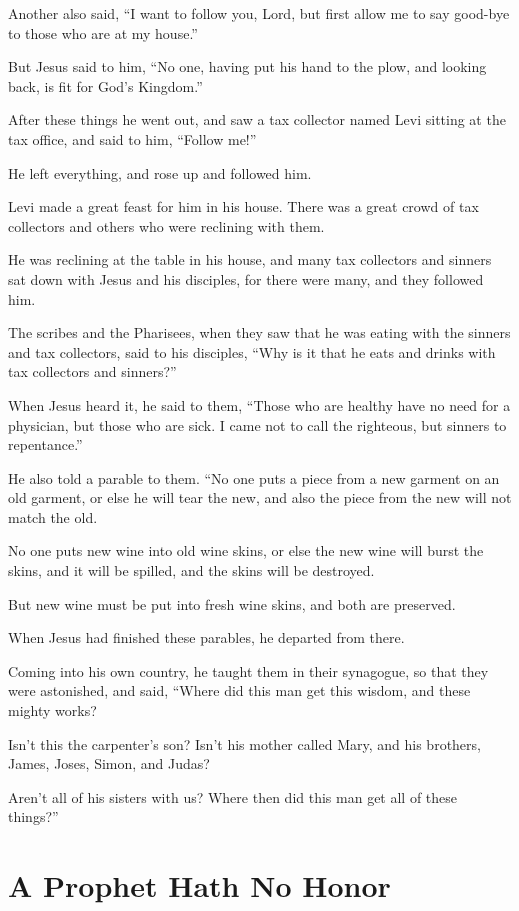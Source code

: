 Another also said, “I want to follow you, Lord, but first allow me to say good-bye to those who are at my house.”

But Jesus said to him, “No one, having put his hand to the plow, and looking back, is fit for God’s Kingdom.”

After these things he went out, and saw a tax collector named Levi sitting at the tax office, and said to him, “Follow me!”

He left everything, and rose up and followed him.

Levi made a great feast for him in his house. There was a great crowd of tax collectors and others who were reclining with them.

He was reclining at the table in his house, and many tax collectors and sinners sat down with Jesus and his disciples, for there were many, and they followed him.

The scribes and the Pharisees, when they saw that he was eating with the sinners and tax collectors, said to his disciples, “Why is it that he eats and drinks with tax collectors and sinners?”

When Jesus heard it, he said to them, “Those who are healthy have no need for a physician, but those who are sick. I came not to call the righteous, but sinners to repentance.”

He also told a parable to them. “No one puts a piece from a new garment on an old garment, or else he will tear the new, and also the piece from the new will not match the old.

No one puts new wine into old wine skins, or else the new wine will burst the skins, and it will be spilled, and the skins will be destroyed.

But new wine must be put into fresh wine skins, and both are preserved.

When Jesus had finished these parables, he departed from there.

Coming into his own country, he taught them in their synagogue, so that they were astonished, and said, “Where did this man get this wisdom, and these mighty works?

Isn’t this the carpenter’s son? Isn’t his mother called Mary, and his brothers, James, Joses, Simon, and Judas?

Aren’t all of his sisters with us? Where then did this man get all of these things?”


\clearpage \section*{A Prophet Hath No Honor}

